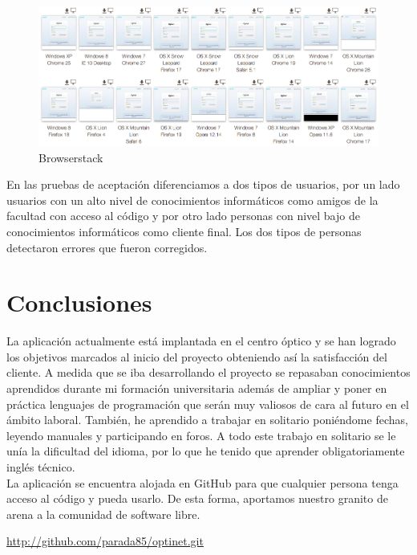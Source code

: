 \documentclass[a4paper,12pt]{article}
\begin{document}
\begin{figure}[!ht]
  \centering
    \includegraphics[scale=0.43]{browserstack}
  \caption{Browserstack}
\label{browserstack}
\end{figure}


\newpage
En las pruebas de aceptación diferenciamos a dos tipos de usuarios, por un lado usuarios con un alto nivel de conocimientos informáticos como amigos de la facultad con acceso al código y por otro lado personas con nivel bajo de conocimientos informáticos como cliente final. Los dos tipos de personas detectaron errores que fueron corregidos.

\section{\fontsize{12}{1}\selectfont Conclusiones}

\noindent La aplicación actualmente está implantada en el centro óptico y se han logrado los objetivos marcados al inicio del proyecto obteniendo así la satisfacción del cliente. A medida que se iba desarrollando el proyecto se repasaban conocimientos aprendidos durante mi formación universitaria además de ampliar y poner en práctica lenguajes de programación que serán muy valiosos de cara al futuro en el ámbito laboral. También, he aprendido a trabajar en solitario poniéndome fechas, leyendo manuales y participando en foros. A todo este trabajo en solitario se le unía la dificultad del idioma, por lo que he tenido que aprender obligatoriamente inglés técnico.\\
La aplicación se encuentra alojada en GitHub para que cualquier persona tenga acceso al código y pueda usarlo. De esta forma, aportamos nuestro granito de arena a la comunidad de software libre.

\begin{center}\url{http://github.com/parada85/optinet.git}\end{center}
\end{document}
